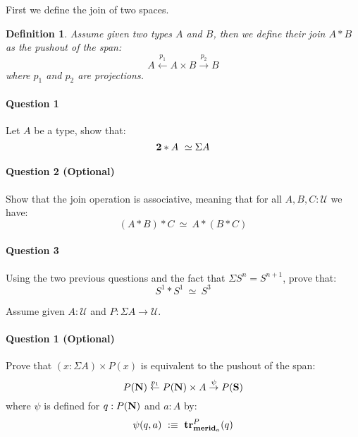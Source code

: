 \documentclass{article}[6pt]%
\newcommand{\U}{{\mathcal U}}
\renewcommand{\r}{\rightarrow}
\newcommand{\tr}{\mathrm{\bf tr}}
\newcommand{\N}{\mathrm{\bf N}}
\renewcommand{\S}{\mathrm{\bf S}}
\newcommand{\merid}{\mathrm{\bf merid}}
\newcommand{\two}{{\bf 2}}
\newtheorem{definition}{Definition}
\begin{document}
\begin{Exercise}[title={The join of two spaces}]

First we define the join of two spaces.

\begin{definition}
Assume given two types $A$ and $B$, then we define their join $A\ast B$ as the pushout of the span:
\[A\overset{p_1}{\leftarrow} A\times B \overset{p_2}{\r} B\]
where $p_1$ and $p_2$ are projections.%
\end{definition}


\paragraph{Question 1} Let $A$ be a type, show that:
\[\two\ast A \ \simeq \Sigma A\]

\paragraph{Question 2 (Optional)} Show that the join operation is associative, meaning that for all $A,B,C:\U$ we have:
\[(A\ast B)\ast C \ \simeq\ A\ast(B\ast C)\] 

\paragraph{Question 3} Using the two previous questions and the fact that $\Sigma S^n = S^{n+1}$, prove that:
\[S^1\ast S^1 \ \simeq \ S^3\]

\end{Exercise} 


\begin{Exercise}[title={Flattening Lemma for suspension}]
Assume given $A:\U$ and $P:\Sigma A \r \U$.

\paragraph{Question 1 (Optional)} Prove that $(x:\Sigma A)\times P(x)$ is equivalent to the pushout of the span:
\[P(\N) \overset{p_1}{\leftarrow} P(\N)\times A \overset{\psi}{\r} P(\S) \]
where $\psi$ is defined for $q:P(\N)$ and $a:A$ by:
\[\psi(q,a) \ :\equiv\ \tr^P_{\merid_a}(q)\]
\end{Exercise}
\end{document}
